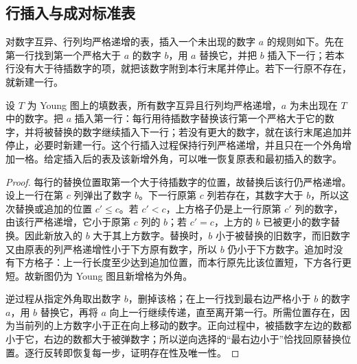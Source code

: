 \subsection{行插入与成对标准表}
\label{b5:subsec:A02:02}

对数字互异、行列均严格递增的表，插入一个未出现的数字 \(a\) 的规则如下。先在第一行找到第一个严格大于 \(a\) 的数字 \(b\)，用 \(a\) 替换它，并把 \(b\) 插入下一行；若本行没有大于待插数字的项，就把该数字附到本行末尾并停止。若下一行原不存在，就新建一行。

\begin{lemma}\label{b5:lem:row-insertion}
	设 \(T\) 为 Young 图上的填数表，所有数字互异且行列均严格递增，\(a\) 为未出现在 \(T\) 中的数字。把 \(a\) 插入第一行：每行用待插数字替换该行第一个严格大于它的数字，并将被替换的数字继续插入下一行；若没有更大的数字，就在该行末尾追加并停止，必要时新建一行。这个行插入过程保持行列严格递增，并且只在一个外角增加一格。给定插入后的表及该新增外角，可以唯一恢复原表和最初插入的数字。
\end{lemma}
\begin{proof}
	每行的替换位置取第一个大于待插数字的位置，故替换后该行仍严格递增。设上一行在第 \(c\) 列弹出了数字 \(b\)。下一行原第 \(c\) 列若存在，其数字大于 \(b\)，所以这次替换或追加的位置 \(c'\le c\)。若 \(c'<c\)，上方格子仍是上一行原第 \(c'\) 列的数字，由该行严格递增，它小于原第 \(c\) 列的 \(b\)；若 \(c'=c\)，上方的 \(b\) 已被更小的数字替换。因此新放入的 \(b\) 大于其上方数字。替换时，\(b\) 小于被替换的旧数字，而旧数字又由原表的列严格递增性小于下方原有数字，所以 \(b\) 仍小于下方数字。追加时没有下方格子：上一行长度至少达到追加位置，而本行原先比该位置短，下方各行更短。故新图仍为 Young 图且新增格为外角。

	逆过程从指定外角取出数字 \(b\)，删掉该格；在上一行找到最右边严格小于 \(b\) 的数字 \(a\)，用 \(b\) 替换它，再将 \(a\) 向上一行继续传递，直至离开第一行。所需位置存在，因为当前列的上方数字小于正在向上移动的数字。正向过程中，被插数字左边的数都小于它，右边的数都大于被弹数字；所以逆向选择的“最右边小于”恰找回原替换位置。逐行反转即恢复每一步，证明存在性及唯一性。
\end{proof}

